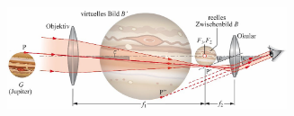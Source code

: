 \begin{center}
	\begin{minipage}{0.2\textwidth}
	\end{minipage}%
	\begin{minipage}{0.3\textwidth}
		\includegraphics[height=3cm,keepaspectratio=true]{Images/vernrohr.png}
	\end{minipage}
\end{center}

\begin{center}
	\begin{minipage}{0.3\textwidth}
		 \\
		 \\
		 \\
	\end{minipage}%
	\begin{minipage}{0.3\textwidth}
		 \\
		 \\
	\end{minipage}
\end{center}


